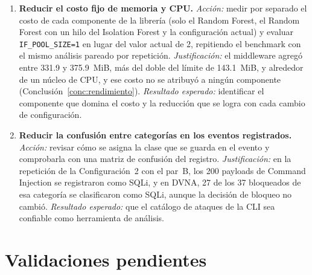 \begin{enumerate}
    \item \textbf{Reducir el costo fijo de memoria y CPU.} \textit{Acción:} medir por separado el
    costo de cada componente de la librería (solo el Random Forest, el Random Forest con un hilo
    del Isolation Forest y la configuración actual) y evaluar \texttt{IF\_POOL\_SIZE=1} en lugar
    del valor actual de 2, repitiendo el benchmark con el mismo análisis pareado por repetición.
    \textit{Justificación:} el middleware agregó entre 331.9 y 375.9~MiB, más del doble del límite
    de 143.1~MiB, y alrededor de un núcleo de CPU, y ese costo no se atribuyó a ningún componente
    (Conclusión~\ref{conc:rendimiento}). \textit{Resultado esperado:} identificar el componente que
    domina el costo y la reducción que se logra con cada cambio de configuración.

    \item \textbf{Reducir la confusión entre categorías en los eventos registrados.}
    \textit{Acción:} revisar cómo se asigna la clase que se guarda en el evento y comprobarla con
    una matriz de confusión del registro. \textit{Justificación:} en la repetición de la
    Configuración~2 con el par~B, los 200 payloads de Command Injection se registraron como SQLi, y
    en DVNA, 27 de los 37 bloqueados de esa categoría se clasificaron como SQLi, aunque la decisión
    de bloqueo no cambió. \textit{Resultado esperado:} que el catálogo de ataques de la CLI sea
    confiable como herramienta de análisis.
\end{enumerate}

\section{Validaciones pendientes}

